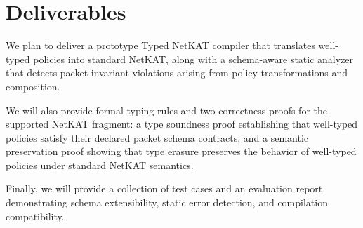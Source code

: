 \section{Deliverables}

We plan to deliver a prototype Typed NetKAT compiler that translates well-typed policies into standard NetKAT, along with a schema-aware static analyzer that detects packet invariant violations arising from policy transformations and composition.

We will also provide formal typing rules and two correctness proofs for the supported NetKAT fragment: a type soundness proof establishing that well-typed policies satisfy their declared packet schema contracts, and a semantic preservation proof showing that type erasure preserves the behavior of well-typed policies under standard NetKAT semantics.

Finally, we will provide a collection of test cases and an evaluation report demonstrating schema extensibility, static error detection, and compilation compatibility.